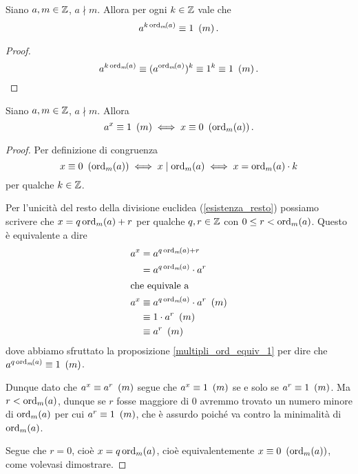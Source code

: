 \begin{proposition}\label{multipli_ord_equiv_1}
    Siano $a, m \in \Z$, $a \nmid m$. Allora per ogni $k \in \Z$ vale che \begin{equation}
        a^{k\ord{a}{m}} \equiv 1 \Mod{m}.
    \end{equation}
\end{proposition}
\begin{proof}
    \[
        a^{k\ord{a}{m}} \equiv (a^{\ord{a}{m}})^k \equiv 1^k \equiv 1 \Mod{m}. \qedhere
    \]
\end{proof}

\begin{proposition}\label{solo_multipli_ord_equiv_1}
    Siano $a, m \in \Z$, $a \nmid m$. Allora \begin{equation}
        a^x \equiv 1 \Mod{m} \iff x \equiv 0 \Mod{\ord{a}{m}}.
    \end{equation}
\end{proposition}
\begin{proof}
    Per definizione di congruenza 
    \[x \equiv 0 \Mod{\ord{a}{m}} \iff x \mid \ord{a}{m} \iff x = \ord{a}{m}\cdot k\] 
    per qualche $k \in \Z$.

    Per l'unicità del resto della divisione euclidea (\ref{esistenza_resto}) possiamo scrivere che $x = q\ord{a}{m} + r$ per qualche $q, r \in \Z$ con $0 \leq r < \ord{a}{m}$. Questo è equivalente a dire \begin{alignat*}
        {1}
        &\begin{alignedat}
            {1}
            a^x &= a^{q\ord{a}{m} + r}\\
            &= a^{q\ord{a}{m}}\cdot a^r
        \end{alignedat} \\
        \intertext{che equivale a}
        &\begin{alignedat}
            {1}
            a^x &\equiv a^{q\ord{a}{m}}\cdot a^r \Mod{m} \\
            &\equiv 1 \cdot a^r \Mod{m}\\
            &\equiv a^r \Mod{m}
        \end{alignedat}
    \end{alignat*}
    dove abbiamo sfruttato la proposizione \ref{multipli_ord_equiv_1} per dire che $a^{q\ord{a}{m}}\equiv 1 \Mod{m}$.

    Dunque dato che $a^x \equiv a^r \Mod{m}$ segue che $a^x \equiv 1 \Mod{m}$ se e solo se $a^r \equiv 1 \Mod{m}$. Ma $r < \ord{a}{m}$, dunque se $r$ fosse maggiore di $0$ avremmo trovato un numero minore di $\ord{a}{m}$ per cui $a^r \equiv 1 \Mod{m}$, che è assurdo poiché va contro la minimalità di $\ord{a}{m}$.

    Segue che $r = 0$, cioè $x = q\ord{a}{m}$, cioè equivalentemente $x \equiv 0 \Mod{\ord{a}{m}}$, come volevasi dimostrare.
\end{proof}

